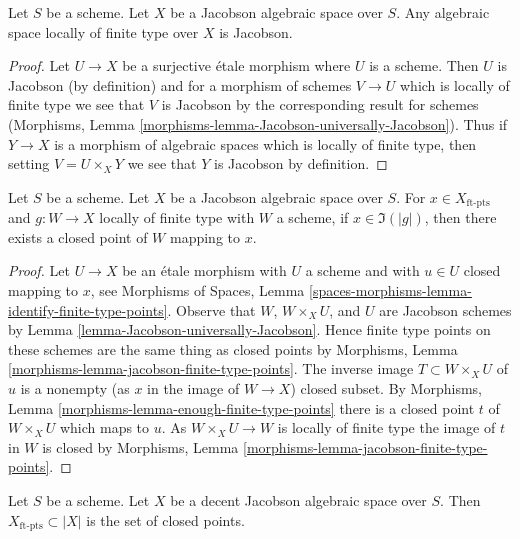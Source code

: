 \begin{lemma}
\label{lemma-Jacobson-universally-Jacobson}
Let $S$ be a scheme. Let $X$ be a Jacobson algebraic space over $S$.
Any algebraic space locally of finite type over $X$ is Jacobson.
\end{lemma}

\begin{proof}
Let $U \to X$ be a surjective \'etale morphism where $U$ is a scheme.
Then $U$ is Jacobson (by definition) and for a morphism of schemes $V \to U$
which is locally of finite type we see that $V$ is Jacobson by the
corresponding result for schemes (Morphisms, Lemma
\ref{morphisms-lemma-Jacobson-universally-Jacobson}).
Thus if $Y \to X$ is a morphism of algebraic spaces which is locally
of finite type, then setting $V = U \times_X Y$ we see that
$Y$ is Jacobson by definition.
\end{proof}

\begin{lemma}
\label{lemma-Jacobson-ft-points-lift-to-closed}
Let $S$ be a scheme. Let $X$ be a Jacobson algebraic space over $S$.
For $x \in X_{\text{ft-pts}}$ and $g : W \to X$ locally of finite type
with $W$ a scheme, if $x \in \Im(|g|)$, then there exists a closed
point of $W$ mapping to $x$.
\end{lemma}

\begin{proof}
Let $U \to X$ be an \'etale morphism with $U$ a scheme and with $u \in U$
closed mapping to $x$, see
Morphisms of Spaces, Lemma
\ref{spaces-morphisms-lemma-identify-finite-type-points}.
Observe that $W$, $W \times_X U$, and $U$ are Jacobson schemes
by Lemma \ref{lemma-Jacobson-universally-Jacobson}.
Hence finite type points on these schemes
are the same thing as closed points by
Morphisms, Lemma \ref{morphisms-lemma-jacobson-finite-type-points}.
The inverse image $T \subset W \times_X U$ of $u$ is a nonempty
(as $x$ in the image of $W \to X$) closed subset.
By Morphisms, Lemma \ref{morphisms-lemma-enough-finite-type-points}
there is a closed point $t$ of $W \times_X U$ which maps to $u$.
As $W \times_X U \to W$ is locally of finite type
the image of $t$ in $W$ is closed by
Morphisms, Lemma \ref{morphisms-lemma-jacobson-finite-type-points}.
\end{proof}

\begin{lemma}
\label{lemma-decent-Jacobson-ft-pts}
Let $S$ be a scheme. Let $X$ be a decent Jacobson algebraic space over $S$.
Then $X_{\text{ft-pts}} \subset |X|$ is the set of closed points.
\end{lemma}

